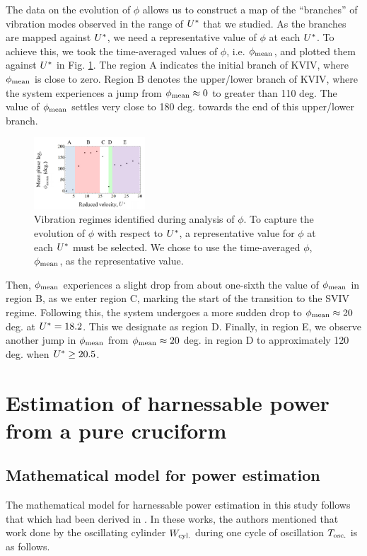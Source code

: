 \documentclass[oneside]{utmthesis}
\begin{document}
The data on the evolution of $\phi$ allows us to construct a map of the ``branches'' of vibration modes observed in the range of $U^{*}$ that we studied. As the branches are mapped against $U^{*}$, we need a representative value of $\phi$ at each $U^{*}$. To achieve this, we took the time-averaged values of $\phi$, i.e. $\phi_{\text{mean}}$, and plotted them against $U^{*}$ in Fig. \ref{fig:phaseAngleRegime}. The region A indicates the initial branch of  KVIV, where  $\phi_{\text{mean}}$ is close to zero. Region B denotes the upper/lower branch of  KVIV, where the system experiences a jump from  $\phi_{\text{mean}} \approx 0$ to greater than 110 deg. The value of $\phi_{\text{mean}}$ settles very close to 180 deg. towards the end of this upper/lower branch.

\begin{figure}
  \centering
  \includegraphics[width=0.37\textwidth]{figs/phaseAngleRegime}
  \caption{Vibration regimes identified during analysis of $\phi$. To capture the evolution of $\phi$ with respect to $U^{*}$, a representative value for $\phi$ at each $U^{*}$ must be selected. We chose to use the time-averaged $\phi$, $\phi_{\text{mean}}$, as the representative value.}
  \label{fig:phaseAngleRegime}
\end{figure}

Then, $\phi_{\text{mean}}$ experiences a slight drop from about one-sixth the value of $\phi_{\text{mean}}$ in region B, as we enter region C, marking the start of the transition to the SVIV regime. Following this, the system undergoes a more sudden drop to $\phi_{\text{mean}} \approx 20$ deg. at $U^{*} = 18.2$. This we designate as region D. Finally, in region E, we observe another jump in $\phi_{\text{mean}}$ from $\phi_{\text{mean}} \approx 20$ deg. in region D to approximately 120 deg. when $U^{*} \geq 20.5$.

\chapter{Estimation of harnessable power from a pure cruciform} \label{chap:estimPow}
\section{Mathematical model for power estimation} \label{sec:mathModel}
The mathematical model for harnessable power estimation in this study follows that which had been derived in \citet{Raghavanetal2007}. In these works, the authors mentioned that work done by the oscillating cylinder $W_{\text{cyl.}}$ during one cycle of oscillation $T_{\text{osc.}}$ is as follows.
\end{document}
